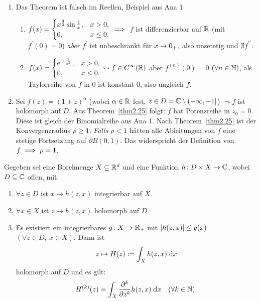 \documentclass[a4paper,twoside,DIV15,BCOR12mm]{scrbook}
\begin{document}
\begin{bsp}\label{bsp2.26}\begin{enumerate}
\item Das Theorem ist falsch im Reellen, Beispiel aus Ana 1:
\begin{enumerate}
\item $\displaystyle f(x)=\begin{cases}x^{\frac{3}{2}}\sin\frac{1}{x},&x>0,\\0,&x\leq 0.\end{cases}\implies$ $f$ ist differenzierbar auf $\mathbb{R}$ (mit $f^\prime(0) = 0$) \textit{aber} $f^\prime$ ist unbeschränkt für $x\rightarrow 0_+$, also unsetetig und $\nexists f^{\prime\prime}$.

\item $\displaystyle f(x)=\begin{cases}\mathrm{e}^{-\frac{1}{x^2}},&x>0,\\0,&x\leq0.\end{cases}\leadsto f\in C^\infty(\mathbb{R})$ aber $f^{(n)}(0)=0$ $(\forall n\in\mathbb{N})$, als Taylorreihe von $f$ in $0$ ist konstant 0, also ungleich $f$.
\end{enumerate}
\item Sei $f(z)=(1+z)^\alpha$ (wobei $\alpha\in\mathbb{R}$ fest, $z\in D = \mathbb{C}\setminus(-\infty,-1]$) $\leadsto f$ ist holomorph auf $D$. Aus Theorem~\ref{thm2.25} folgt: $f$ hat Potenzreihe in $z_0=0$. Diese ist gleich der Binomialreihe aus Ana 1. Nach Theorem~\ref{thm2.25} ist der Konvergenzradius $\rho\geq 1$. \textit{Falls} $\rho <1$ hätten alle Ableitungen von $f$ eine stetige Fortsetzung auf $\partial B(0,1)$. Das widerspricht der Definition von $f\implies\rho=1$.
\end{enumerate}
\end{bsp}

\begin{kor}\label{kor2.27}
Gegeben sei eine Borelmenge $X\subseteq\mathbb{R}^d$ und eine Funktion $h\colon D\times X\to\mathbb{C}$, wobei $D\subseteq\mathbb{C}$ offen, mit:
\begin{enumerate}
\item $\forall z\in D$ ist $x\mapsto h(z,x)$ integrierbar auf $X$.
\item $\forall x\in X$ ist $z\mapsto h(z,x)$ holomorph auf $D$.
\item Es existiert ein integrierbares $g\colon X\to\mathbb{R}_+$ mit $\left\lvert h(z,x)\right\lvert\leq g(x)$ $(\forall z\in D,\ x\in X)$. Dann ist
\[z\mapsto H(z):= \int_{X}^{}{h(z,x)}\;\mathrm{d} x\]
holomorph auf $D$ und es gilt:
\[H^{(k)}(z)=\int_{X}^{}{\frac{\partial^k}{\partial z^k}h(z,x)}\;\mathrm{d} x\quad(\forall k\in\mathbb{N}).\]
\end{enumerate}
\end{kor}
\end{document}
